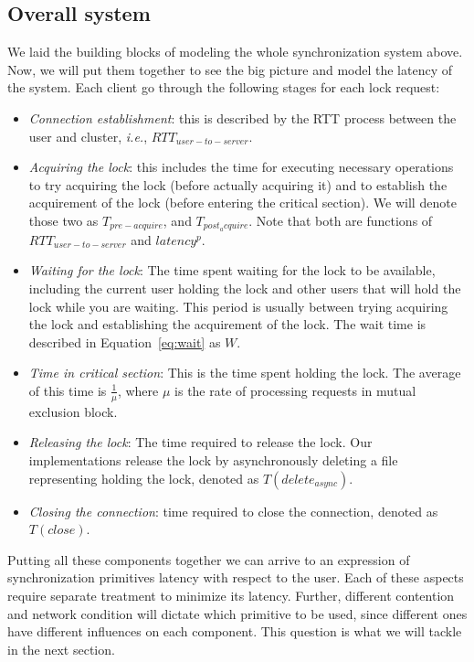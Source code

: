 \subsection{Overall system}
We laid the building blocks of modeling the whole synchronization system above. Now, we will put them together to see the big picture and model the latency of the system. Each client go through the following stages for each lock request:
\begin{itemize}
\item{\emph{Connection establishment}: this is described by the RTT process between the user and cluster, \emph{i.e.}, $RTT_{user-to-server}$.}
\item{\emph{Acquiring the lock}: this includes the time for executing necessary operations to try acquiring the lock (before actually acquiring it) and to establish the acquirement of the lock (before entering the critical section). We will denote those two as $T_{pre-acquire}$, and $T_{post_acquire}$. Note that both are functions of $RTT_{user-to-server}$ and $latency^p$.}
\item{\emph{Waiting for the lock}: The time spent waiting for the lock to be available, including the current user holding the lock and other users that will hold the lock while you are waiting. This period is usually between trying acquiring the lock and establishing the acquirement of the lock. The wait time is described in Equation~\ref{eq:wait} as $W$.}
\item{\emph{Time in critical section}: This is the time spent holding the lock. The average of this time is $\frac{1}{\mu}$, where $\mu$ is the rate of processing requests in mutual exclusion block.}
\item{\emph{Releasing the lock}: The time required to release the lock. Our implementations release the lock by asynchronously deleting a file representing holding the lock, denoted as $T(delete_{async})$. }
\item{\emph{Closing the connection}: time required to close the connection, denoted as $T(close)$. }
\end{itemize}
Putting all these components together we can arrive to an expression of synchronization primitives latency with respect to the user. Each of these aspects require separate treatment to minimize its latency. Further, different contention and network condition will dictate which primitive to be used, since different ones have different influences on each component. This question is what we will tackle in the next section.











